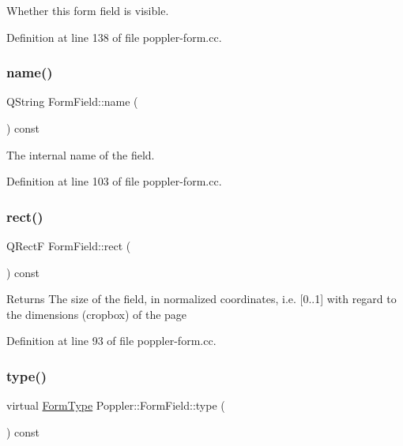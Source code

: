 Whether this form field is visible. 

Definition at line 138 of file poppler-\/form.\+cc.

\mbox{\label{class_poppler_1_1_form_field_afcd3893ef723edb63aa90eb4e514b7c8}} 
\subsubsection{\texorpdfstring{name()}{name()}}
{\footnotesize\ttfamily Q\+String Form\+Field\+::name (\begin{DoxyParamCaption}{ }\end{DoxyParamCaption}) const}

The internal name of the field. 

Definition at line 103 of file poppler-\/form.\+cc.

\mbox{\label{class_poppler_1_1_form_field_ae5922abdb6e6fbae7b147a5f1e39712e}} 
\subsubsection{\texorpdfstring{rect()}{rect()}}
{\footnotesize\ttfamily Q\+RectF Form\+Field\+::rect (\begin{DoxyParamCaption}{ }\end{DoxyParamCaption}) const}

\begin{DoxyReturn}{Returns}
The size of the field, in normalized coordinates, i.\+e. \mbox{[}0..1\mbox{]} with regard to the dimensions (cropbox) of the page 
\end{DoxyReturn}


Definition at line 93 of file poppler-\/form.\+cc.

\mbox{\label{class_poppler_1_1_form_field_aec536e2f0468aedcc6b6d7df034442b2}} 
\subsubsection{\texorpdfstring{type()}{type()}}
{\footnotesize\ttfamily virtual \hyperlink{class_poppler_1_1_form_field_af9b28bf05b29780f81445b21a0ed7423}{Form\+Type} Poppler\+::\+Form\+Field\+::type (\begin{DoxyParamCaption}{ }\end{DoxyParamCaption}) const\hspace{0.3cm}{\ttfamily [pure virtual]}}

